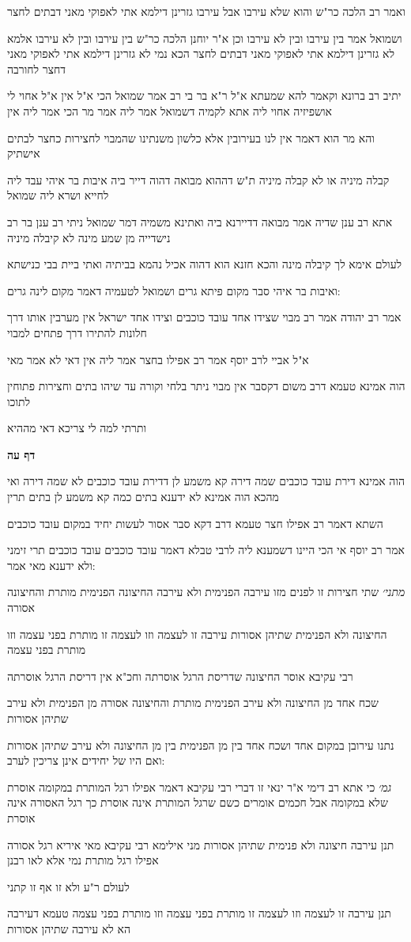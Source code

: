 \documentclass[12pt, openany]{book}
\newcommand{\sethebfont}{
\fontsize{10.5pt}{21.0pt} \selectfont
}
\newcommand{\textblock}[1]{
{\sethebfont #1\\}	
}
\newcommand{\sectname}{}
\newcommand{\newsection}[1]{
	\addcontentsline{toc}{section}{#1}
	\renewcommand{\sectname}{#1}	
	\vspace{-\baselineskip}
	\begin{center}
		\textbf{%
\fontsize{16pt}{16pt}\selectfont
			#1}
	\end{center}
	\vspace{-\baselineskip}
	\nopagebreak
}
\begin{document}
\textblock{ואמר רב הלכה כר"ש והוא שלא עירבו אבל עירבו גזרינן דילמא אתי לאפוקי מאני דבתים לחצר}
\textblock{ושמואל אמר בין עירבו ובין לא עירבו וכן א"ר יוחנן הלכה כר"ש בין עירבו ובין לא עירבו אלמא לא גזרינן דילמא אתי לאפוקי מאני דבתים לחצר הכא נמי לא גזרינן דילמא אתי לאפוקי מאני דחצר לחורבה}
\textblock{יתיב רב ברונא וקאמר להא שמעתא א"ל ר"א בר בי רב אמר שמואל הכי א"ל אין א"ל אחוי לי אושפיזיה אחוי ליה אתא לקמיה דשמואל אמר ליה אמר מר הכי אמר ליה אין}
\textblock{והא מר הוא דאמר אין לנו בעירובין אלא כלשון משנתינו שהמבוי לחצירות כחצר לבתים אישתיק}
\textblock{קבלה מיניה או לא קבלה מיניה ת"ש דההוא מבואה דהוה דייר ביה איבות בר איהי עבד ליה לחייא ושרא ליה שמואל}
\textblock{אתא רב ענן שדיה אמר מבואה דדיירנא ביה ואתינא משמיה דמר שמואל ניתי רב ענן בר רב נישדייה מן שמע מינה לא קיבלה מיניה}
\textblock{לעולם אימא לך קיבלה מינה והכא חזנא הוא דהוה אכיל נהמא בביתיה ואתי ביית בבי כנישתא}
\textblock{ואיבות בר איהי סבר מקום פיתא גרים ושמואל לטעמיה דאמר מקום לינה גרים:}
\textblock{אמר רב יהודה אמר רב מבוי שצידו אחד עובד כוכבים וצידו אחד ישראל אין מערבין אותו דרך חלונות להתירו דרך פתחים למבוי}
\textblock{א"ל אביי לרב יוסף אמר רב אפילו בחצר אמר ליה אין דאי לא אמר מאי}
\textblock{הוה אמינא טעמא דרב משום דקסבר אין מבוי ניתר בלחי וקורה עד שיהו בתים וחצירות פתוחין לתוכו}
\textblock{ותרתי למה לי צריכא דאי מההיא}
\newsection{דף עה}
\textblock{הוה אמינא דירת עובד כוכבים שמה דירה קא משמע לן דדירת עובד כוכבים לא שמה דירה ואי מהכא הוה אמינא לא ידענא בתים כמה קא משמע לן בתים תרין}
\textblock{השתא דאמר רב אפילו חצר טעמא דרב דקא סבר אסור לעשות יחיד במקום עובד כוכבים}
\textblock{אמר רב יוסף אי הכי היינו דשמענא ליה לרבי טבלא דאמר עובד כוכבים עובד כוכבים תרי זימני ולא ידענא מאי אמר:}
\textblock{{\large\emph{מתני׳}} שתי חצירות זו לפנים מזו עירבה הפנימית ולא עירבה החיצונה הפנימית מותרת והחיצונה אסורה}
\textblock{החיצונה ולא הפנימית שתיהן אסורות עירבה זו לעצמה וזו לעצמה זו מותרת בפני עצמה וזו מותרת בפני עצמה}
\textblock{רבי עקיבא אוסר החיצונה שדריסת הרגל אוסרתה וחכ"א אין דריסת הרגל אוסרתה}
\textblock{שכח אחד מן החיצונה ולא עירב הפנימית מותרת והחיצונה אסורה מן הפנימית ולא עירב שתיהן אסורות}
\textblock{נתנו עירובן במקום אחד ושכח אחד בין מן הפנימית בין מן החיצונה ולא עירב שתיהן אסורות ואם היו של יחידים אינן צריכין לערב:}
\textblock{{\large\emph{גמ׳}} כי אתא רב דימי א"ר ינאי זו דברי רבי עקיבא דאמר אפילו רגל המותרת במקומה אוסרת שלא במקומה אבל חכמים אומרים כשם שרגל המותרת אינה אוסרת כך רגל האסורה אינה אוסרת}
\textblock{תנן עירבה חיצונה ולא פנימית שתיהן אסורות מני אילימא רבי עקיבא מאי איריא רגל אסורה אפילו רגל מותרת נמי אלא לאו רבנן}
\textblock{לעולם ר"ע ולא זו אף זו קתני}
\textblock{תנן עירבה זו לעצמה וזו לעצמה זו מותרת בפני עצמה וזו מותרת בפני עצמה טעמא דעירבה הא לא עירבה שתיהן אסורות}
\end{document}

